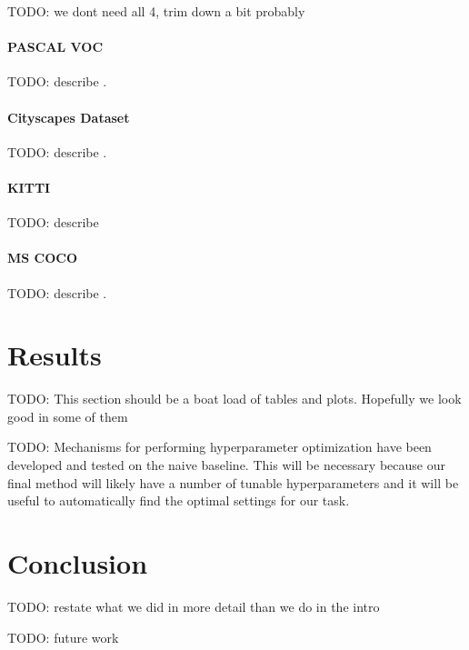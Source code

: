\documentclass[twocolumn]{article}
\newcommand{\todo}[1]{}
\renewcommand{\todo}[1]{{\color{red} TODO: {#1}}}
\newcommand{\seclab}[1]{\label{sec:#1}}
\begin{document}
\todo{we dont need all 4, trim down a bit probably}

\paragraph{PASCAL VOC} \todo{describe} \cite{Everingham10}.

\paragraph{Cityscapes Dataset} \todo{describe} \cite{cordts2016cityscapes}.

\paragraph{KITTI} \todo{describe} \cite{geiger2012we}

\paragraph{MS COCO} \todo{describe} \cite{lin2014microsoft}.

\section{Results}\seclab{results}

\todo{This section should be a boat load of tables and plots. Hopefully we look good in some of them}

\todo{
Mechanisms for performing hyperparameter optimization have been developed and tested on the naive baseline. This will be
necessary because our final method will likely have a number of tunable hyperparameters and it will be useful to automatically
find the optimal settings for our task.
}

\section{Conclusion}

\todo{restate what we did in more detail than we do in the intro}

\todo{future work}


 
\end{document}
